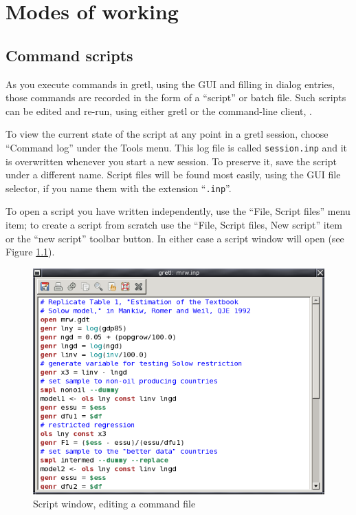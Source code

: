 \chapter{Modes of working}
\label{modes}

\section{Command scripts}
\label{scripts}

As you execute commands in gretl, using the GUI and filling in
dialog entries, those commands are recorded in the form of a
``script'' or batch file.  Such scripts can be edited and re-run,
using either gretl or the command-line client, .

To view the current state of the script at any point in a gretl
session, choose ``Command log'' under the Tools menu. This log
file is called \verb+session.inp+ and it is overwritten whenever you
start a new session.  To preserve it, save the script under a
different name.  Script files will be found most easily, using the GUI
file selector, if you name them with the extension ``\verb+.inp+''.

To open a script you have written independently, use the ``File,
Script files'' menu item; to create a script from scratch use the
``File, Script files, New script'' item or the ``new script'' toolbar
button.  In either case a script window will open (see Figure
\ref{fig-scriptwin}).

\begin{figure}[htbp]
  \begin{center}
    \includegraphics[scale=0.5]{figures/scriptwin}
  \end{center}
  \caption{Script window, editing a command file}
  \label{fig-scriptwin}
\end{figure}

